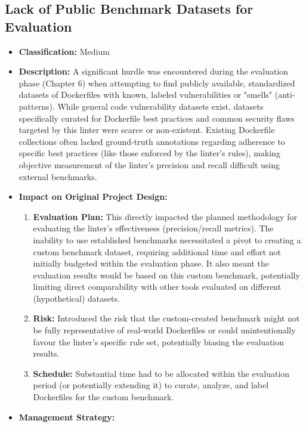 \subsection{Lack of Public Benchmark Datasets for Evaluation}
\label{subsec:benchmark_difficulty}
\begin{itemize}
    \item \textbf{Classification:} Medium
    \item \textbf{Description:} A significant hurdle was encountered during the evaluation phase (Chapter 6) when attempting to find publicly available, standardized datasets of Dockerfiles with known, labeled vulnerabilities or "smells" (anti-patterns). While general code vulnerability datasets exist, datasets specifically curated for Dockerfile best practices and common security flaws targeted by this linter were scarce or non-existent. Existing Dockerfile collections often lacked ground-truth annotations regarding adherence to specific best practices (like those enforced by the linter's rules), making objective measurement of the linter's precision and recall difficult using external benchmarks.
    \item \textbf{Impact on Original Project Design:}
        \begin{enumerate}
            \item \textbf{Evaluation Plan:} This directly impacted the planned methodology for evaluating the linter's effectiveness (precision/recall metrics). The inability to use established benchmarks necessitated a pivot to creating a custom benchmark dataset, requiring additional time and effort not initially budgeted within the evaluation phase. It also meant the evaluation results would be based on this custom benchmark, potentially limiting direct comparability with other tools evaluated on different (hypothetical) datasets.
            \item \textbf{Risk:} Introduced the risk that the custom-created benchmark might not be fully representative of real-world Dockerfiles or could unintentionally favour the linter's specific rule set, potentially biasing the evaluation results.
            \item \textbf{Schedule:} Substantial time had to be allocated within the evaluation period (or potentially extending it) to curate, analyze, and label Dockerfiles for the custom benchmark.
        \end{enumerate}
    \item \textbf{Management Strategy:}
        \begin{itemize}

\end{itemize}
\end{itemize}
